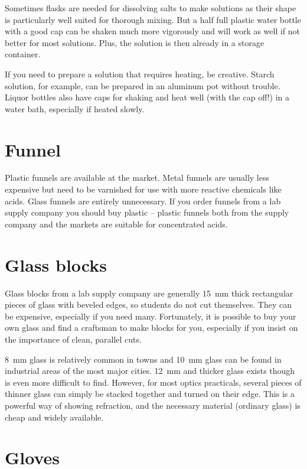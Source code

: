 Sometimes flasks are needed for dissolving salts 
to make solutions as their shape is particularly well suited 
for thorough mixing. 
But a half full plastic water bottle with a good cap 
can be shaken much more vigorously 
and will work as well if not better for most solutions. 
Plus, 
the solution is then already in a storage container.

If you need to prepare a solution that requires heating, 
be creative. 
Starch solution, 
for example, 
can be prepared in an aluminum pot without trouble. 
Liquor bottles also have caps for shaking and heat well 
(with the cap off!) in a water bath, 
especially if heated slowly.

\section{Funnel}
Plastic funnels are available at the market. 
Metal funnels are usually less expensive 
but need to be varnished for use with more reactive chemicals like acids. 
Glass funnels are entirely unnecessary. 
If you order funnels from a lab supply company 
you should buy plastic -- 
plastic funnels both from the supply company and the markets 
are suitable for concentrated acids.

\section{Glass blocks}
Glass blocks from a lab supply company are 
generally 15~mm thick rectangular pieces of glass with beveled edges, 
so students do not cut themselves. 
They can be expensive, 
especially if you need many. 
Fortunately, 
it is possible to buy your own glass 
and find a craftsman to make blocks for you, 
especially if you insist on the importance of clean, 
parallel cuts. 
 
8~mm glass is relatively common in towns 
and 10~mm glass can be found in industrial areas of the most major cities. 
12~mm and thicker glass exists though is even more difficult to find. 
However, 
for most optics practicals, 
several pieces of thinner glass can simply be stacked together and 
turned on their edge. 
This is a powerful way of showing refraction, 
and the necessary material (ordinary glass) is cheap and widely available.

\section{Gloves}

